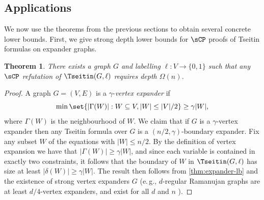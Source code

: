 \documentclass[11pt]{article}
\newtheorem{theorem}{Theorem}[section]
\newcommand{\eg}{e.\,g.}
\begin{document}
\subsection{Applications}
We now use the theorems from the previous sections to obtain several concrete lower bounds.
First, we give strong depth lower bounds for $\sCP$ proofs of Tseitin formulas on expander graphs. 
\begin{theorem}\label{cor:TseitinLowerBound}
	There exists a graph $G$ and labelling $\ell:V \rightarrow \{0,1\}$ such that any $\sCP$ refutation of $\Tseitin(G,\ell)$ requires depth $\Omega(n)$. 
\end{theorem}
\begin{proof}
	A graph $G=(V,E)$ is a $\gamma$-\emph{vertex expander} if 
	\[\min \set{|\Gamma(W)| : W \subseteq V, |W| \leq |V|/2} \geq \gamma|W|,\]
	where $\Gamma(W)$ is the neighbourhood of $W$.
	We claim that if $G$ is a $\gamma$-vertex expander then any Tseitin formula over $G$ is a $(n/2, \gamma)$-boundary expander.
	Fix any subset $W$ of the equations with $|W| \leq n/2$. 
	By the definition of vertex expansion we have that $|\Gamma(W)| \geq \gamma|W|$, and since each variable is contained in exactly two constraints, it follows that the boundary of $W$ in $\Tseitin(G,\ell)$ has size at least $|\delta(W)| \geq \gamma|W|$.
	The result then follows from \autoref{thm:expander-lb} and the existence of strong vertex expanders $G$ (\eg, $d$-regular Ramanujan graphs are at least $d/4$-vertex expanders, and exist for all $d$ and $n$ \cite{MarcusSS18}).
\end{proof}
\end{document}
